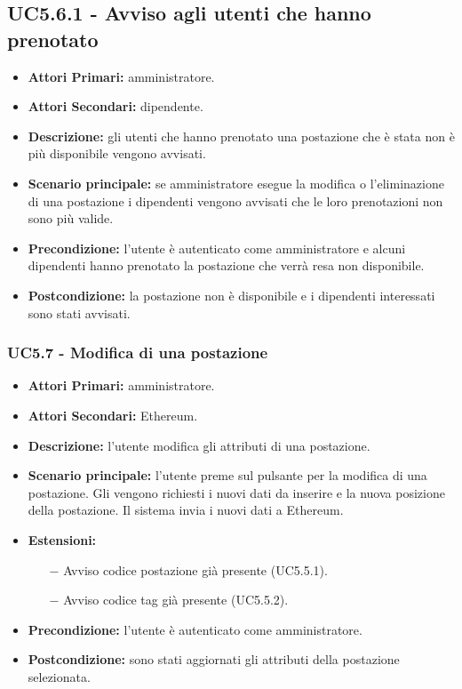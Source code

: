 \subsection{ UC5.6.1 - Avviso agli utenti che hanno prenotato}
\begin{itemize}
	\item\textbf{Attori Primari:}
	amministratore.
	\item\textbf{Attori Secondari:}
	dipendente.
	\item\textbf{Descrizione:}
	gli utenti che hanno prenotato una postazione che è stata non è più disponibile vengono avvisati.
	\item\textbf{Scenario principale:}
	se amministratore esegue la modifica o l'eliminazione di una postazione i dipendenti vengono avvisati che le loro prenotazioni non sono più valide.
	\item\textbf{Precondizione:}
	l'utente è autenticato come amministratore e alcuni dipendenti hanno prenotato la postazione che verrà resa non disponibile.
	\item\textbf{Postcondizione:}
	la postazione non è disponibile e i dipendenti interessati sono stati avvisati.
\end{itemize}

\subsubsection{ UC5.7 - Modifica di una postazione}
\begin{itemize}
	\item\textbf{Attori Primari:}
	amministratore.
	\item\textbf{Attori Secondari:}
	Ethereum.
	\item\textbf{Descrizione:}
	l'utente modifica gli attributi di una postazione.
	\item\textbf{Scenario principale:} 
	l'utente preme sul pulsante per la modifica di una postazione. Gli vengono richiesti i nuovi dati da inserire e la nuova posizione della postazione. Il sistema invia i nuovi dati a Ethereum.
	\item\textbf{Estensioni:}
	\begin{itemize}
		\item[$-$] Avviso codice postazione già presente (UC5.5.1).
		\item[$-$] Avviso codice tag già presente (UC5.5.2).
	\end{itemize}
	\item\textbf{Precondizione:} 
	l'utente è autenticato come amministratore.
	\item\textbf{Postcondizione:}
	sono stati aggiornati gli attributi della postazione selezionata.
\end{itemize}

